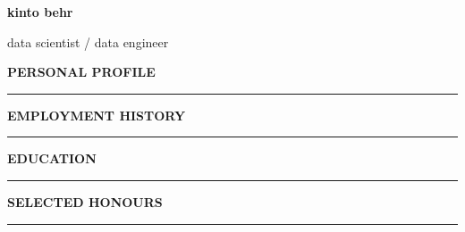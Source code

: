 \documentclass[10pt]{article}
\begin{document}
\lsstyle

\pagecolor{skyblue}

\newcommand{\stub}{\textcolor{skyblue}{\rule{3cm}{3mm}}}

\begin{huge}\begin{center}{\bf kinto behr}\end{center}\end{huge}
\begin{Large}\begin{center}{data scientist / data engineer}\end{center}\end{Large}
\vspace{1cm}

\begin{large}
{\bf PERSONAL PROFILE} \\
\textcolor{gray}{\rule{2cm}{2mm}}
\end{large}
\vspace{5pt}

\begin{small}
\end{small}

\vspace{1cm}
\begin{large}
{\bf EMPLOYMENT HISTORY} \\
\textcolor{gray}{\rule{2cm}{2mm}}
\end{large}
\vspace{5pt}


\vspace{1cm}
\begin{large}
{\bf EDUCATION} \\
\textcolor{gray}{\rule{2cm}{2mm}}
\end{large}
\vspace{5pt}


\vspace{1cm}
\begin{large}
{\bf SELECTED HONOURS} \\
\textcolor{gray}{\rule{2cm}{2mm}}
\end{large}
\begin{small}
\end{small}
\end{document}
